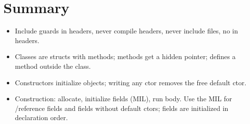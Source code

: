 \section*{Summary}
\begin{itemize}
  \item Include guards in headers, never compile headers, never include
         files, no  in headers.
  \item Classes are structs with methods; methods get a hidden 
        pointer;  defines a method outside the class.
  \item Constructors initialize objects; writing any ctor removes the free
        default ctor.
  \item Construction: allocate, initialize fields (MIL), run body. Use the MIL
        for /reference fields and fields without default ctors;
        fields are initialized in declaration order.
\end{itemize}
